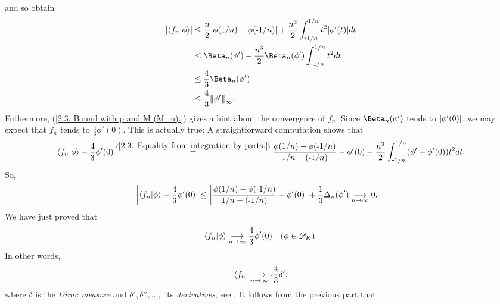 %
and so obtain %
%
  \begin{align}
    \magnitude{\bra{f_n}\ket{\phi}}
    & \leq  
      \frac{n}{2}\magnitude{\phi(1/n) - \phi(\minus 1/n)}
        + 
      \frac{n^3}{2}\int_{\minus1/n}^{1/n} t^{2}\lvert\phi'(t)\rvert dt
      \\
      & \leq  
        \Beta_{n}(\phi') 
          + 
        \frac{n^3}{2} \Beta_{n}(\phi') \int_{\minus1/n}^{1/n} t^{2} dt \\
      \label{2.3. Bound with p and M (M_n).}
      & \leq 
      \frac{4}{3} \Beta_{n}(\phi') \\
      \label{2.3. Bound with p and M (concrete).}
      & \leq 
      \frac{4}{3} \norma{\infty}{\phi'}.
  \end{align}
%
Futhermore, %
%
  (\ref{2.3. Bound with p and M (M_n).}) %
% 
gives a hint about the convergence of $f_n$: Since %
%
  $\Beta_{n}(\phi')$ tends to $\abs{\phi'(0)}$, %
%
we may expect that %
%
  $f_n$ tends to $\frac{4}{3}\phi'(0)$. %
%
This is actually true: A straightforward computation shows that %
%
  \begin{align}
    \bra{f_n}\ket{\phi} - \frac{4}{3}\phi'(0)
      \overset{(\ref{2.3. Equality from integration by parts.})}{=} 
    \frac{\phi(1/n) - \phi(\text{\small{-}} 1/n)}{1/n - (\text{\small{-}} 1/n)}
    - \phi'(0)
    - \frac{n^3}{2} \int_{\text{\small{-}} 1/n}^{1/n} (\phi' - \phi'(0)) t^{2} dt.
  \end{align}
%
So, 
%
  \begin{align}
    \abs{\bra{f_n}\ket{\phi} -\frac{4}{3} \phi'(0)} 
      & \leq 
    \abs{
      \frac{\phi(1/n) - \phi(\text{\small{-}} 1/n)}{1/n - (\text{\small{-}} 1/n)}
      - \phi'(0)
    }
    + \frac{1}{3}\Delta_{n}(\phi') 
    \underset{n\to \infty}{\longrightarrow} 0.
  \end{align}
%
We have just proved that 
%
  \begin{align}\label{2.3. (f_n) converges to Dirac (1).}
    \bra{f_n}\ket{\phi} \tendsto{n}{\infty} %
    \frac{4}{3}\phi'(0) 
    \quad (\phi\in \mathscr{D}_K).
  \end{align}
%
In other words, 
%
  \begin{align}
    \bra{f_n} \underset{n\to \infty}{\longrightarrow}\text{\small{-}} \frac{4}{3}\delta' ,
  \end{align}
%
where $\delta$ is the \textit{Dirac measure} and 
$\delta', \delta'', \dots, $ its \textit{derivatives}; %
%
  see .
%
\newline\newline\noindent
It follows from the previous part that %
